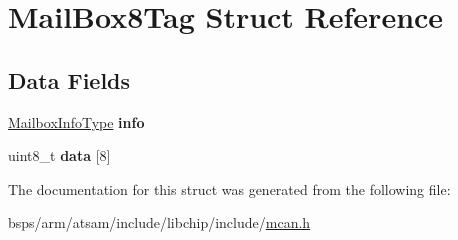 \hypertarget{structMailBox8Tag}{}\section{Mail\+Box8\+Tag Struct Reference}
\label{structMailBox8Tag}
\subsection*{Data Fields}
\begin{DoxyCompactItemize}
\item 
\mbox{\label{structMailBox8Tag_aaf624f875da8f543c30abab51ecb50f8}} 
\mbox{\hyperlink{structMailboxInfoTag}{Mailbox\+Info\+Type}} {\bfseries info}
\item 
\mbox{\label{structMailBox8Tag_a34cb0bb05daa7d48638d024f761bb7ed}} 
uint8\+\_\+t {\bfseries data} \mbox{[}8\mbox{]}
\end{DoxyCompactItemize}


The documentation for this struct was generated from the following file\+:\begin{DoxyCompactItemize}
\item 
bsps/arm/atsam/include/libchip/include/\mbox{\hyperlink{mcan_8h}{mcan.\+h}}\end{DoxyCompactItemize}
